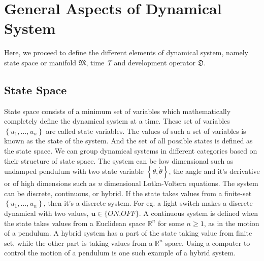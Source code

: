 \section{General Aspects of Dynamical System}
Here, we proceed to define the different elements of dynamical system, namely state space or manifold $\mathfrak{M}$, time \textit{T} and development operator $\mathfrak{D}$.

\subsection{State Space}
State space consists of a minimum set of variables which mathematically completely define the dynamical system at a time. These set of variables $\left\lbrace \textit{u}_{1},\ldots,\textit{u}_{n}\right\rbrace$ are called state variables. The values of such a set of variables is known as the state of the system. And the set of all possible states is defined as the state space.
We can group dynamical systems in different categories based on their structure of state space. The system can be low dimensional such as undamped pendulum with two state variable $\left\lbrace\theta,\dot{\theta}\right\rbrace$, the angle and it’s derivative or of high dimensions such as \textit{n} dimensional Lotka-Voltera equations. 
The system can be discrete, continuous, or hybrid. If the state takes values from a finite-set $\left\lbrace \textit{u}_{1},\ldots,\textit{u}_{n}\right\rbrace$, then it’s a discrete system. For eg. a light switch makes a discrete dynamical with two values, $\textbf{u}\in\lbrace\textit{ON,OFF}\rbrace$. A continuous system is defined when the state takes values from a Euclidean space $\mathbb{R}^n$ for some $\textit{n}\geq1$, as in the motion of a pendulum. A hybrid system has a part of the state taking value from finite set, while the other part is taking values from a $\mathbb{R}^n$ space. Using a computer to control the motion of a pendulum is one such example of a hybrid system.


